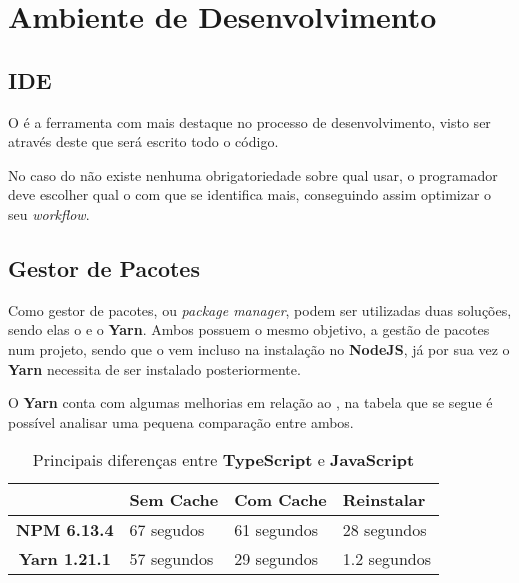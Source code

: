 \section{Ambiente de Desenvolvimento}

\subsection{IDE}

O  é a ferramenta com mais destaque no processo de desenvolvimento, visto ser através deste que será escrito todo o código.

No caso do  não existe nenhuma obrigatoriedade sobre qual usar, o programador deve escolher qual o  com que se identifica mais, conseguindo assim optimizar o seu \textit{workflow}.




\subsection{Gestor de Pacotes}

Como gestor de pacotes, ou \textit{package manager}, podem ser utilizadas duas soluções, sendo elas o \textbf{} e o \textbf{Yarn}. Ambos possuem o mesmo objetivo, a gestão de pacotes num projeto, sendo que o \textbf{} vem incluso na instalação no \textbf{NodeJS}, já por sua vez o \textbf{Yarn} necessita de ser instalado posteriormente.

O \textbf{Yarn} conta com algumas melhorias em relação ao \textbf{}, na tabela que se segue é possível analisar uma pequena comparação entre ambos.

\begin{table}[h!]
	\renewcommand{\arraystretch}{1.25}
	\centering
	\begin{tabularx}{.85\textwidth}{ |c X X X| }
		\rowcolor{estg} & {\color[HTML]{FFFFFF} \textbf{Sem Cache}} & 	{\color[HTML]{FFFFFF} \textbf{Com Cache}} & {\color[HTML]{FFFFFF} \textbf{Reinstalar}} \\\hline


		\textbf{NPM 6.13.4} & 67 segudos & 61 segundos & 28 segundos \\\hline
		\textbf{Yarn 1.21.1} & 57 segundos & 29 segundos & 1.2 segundos \\\hline
	\end{tabularx}

	\caption{Principais diferenças entre \textbf{TypeScript} e \textbf{JavaScript}}
\end{table}